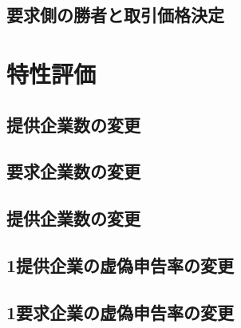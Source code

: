 \hypertarget{ux8981ux6c42ux5074ux306eux52ddux8005ux3068ux53d6ux5f15ux4fa1ux683cux6c7aux5b9a}{%
\subsection{要求側の勝者と取引価格決定}\label{ux8981ux6c42ux5074ux306eux52ddux8005ux3068ux53d6ux5f15ux4fa1ux683cux6c7aux5b9a}}

\hypertarget{ux7279ux6027ux8a55ux4fa1-1}{%
\section{特性評価}\label{ux7279ux6027ux8a55ux4fa1-1}}

\hypertarget{ux63d0ux4f9bux4f01ux696dux6570ux306eux5909ux66f4-2}{%
\subsection{提供企業数の変更}\label{ux63d0ux4f9bux4f01ux696dux6570ux306eux5909ux66f4-2}}

\hypertarget{ux8981ux6c42ux4f01ux696dux6570ux306eux5909ux66f4-1}{%
\subsection{要求企業数の変更}\label{ux8981ux6c42ux4f01ux696dux6570ux306eux5909ux66f4-1}}

\hypertarget{ux63d0ux4f9bux4f01ux696dux6570ux306eux5909ux66f4-3}{%
\subsection{提供企業数の変更}\label{ux63d0ux4f9bux4f01ux696dux6570ux306eux5909ux66f4-3}}

\hypertarget{ux63d0ux4f9bux4f01ux696dux306eux865aux507dux7533ux544aux7387ux306eux5909ux66f4-1}{%
\subsection{1提供企業の虚偽申告率の変更}\label{ux63d0ux4f9bux4f01ux696dux306eux865aux507dux7533ux544aux7387ux306eux5909ux66f4-1}}

\hypertarget{ux8981ux6c42ux4f01ux696dux306eux865aux507dux7533ux544aux7387ux306eux5909ux66f4-1}{%
\subsection{1要求企業の虚偽申告率の変更}\label{ux8981ux6c42ux4f01ux696dux306eux865aux507dux7533ux544aux7387ux306eux5909ux66f4-1}}

